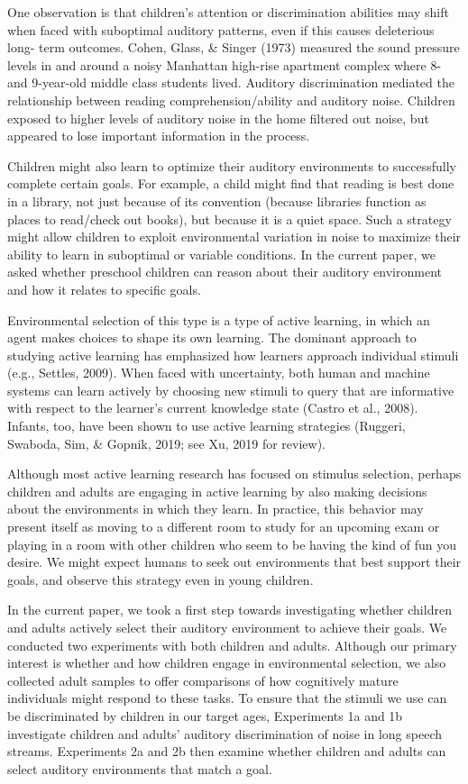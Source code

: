 \documentclass[10pt, letterpaper]{article}
\begin{document}
One observation is that children's attention or discrimination abilities
may shift when faced with suboptimal auditory patterns, even if this
causes deleterious long- term outcomes. Cohen, Glass, \& Singer (1973)
measured the sound pressure levels in and around a noisy Manhattan
high-rise apartment complex where 8- and 9-year-old middle class
students lived. Auditory discrimination mediated the relationship
between reading comprehension/ability and auditory noise. Children
exposed to higher levels of auditory noise in the home filtered out
noise, but appeared to lose important information in the process.

Children might also learn to optimize their auditory environments to
successfully complete certain goals. For example, a child might find
that reading is best done in a library, not just because of its
convention (because libraries function as places to read/check out
books), but because it is a quiet space. Such a strategy might allow
children to exploit environmental variation in noise to maximize their
ability to learn in suboptimal or variable conditions. In the current
paper, we asked whether preschool children can reason about their
auditory environment and how it relates to specific goals.

Environmental selection of this type is a type of active learning, in
which an agent makes choices to shape its own learning. The dominant
approach to studying active learning has emphasized how learners
approach individual stimuli (e.g., Settles, 2009). When faced with
uncertainty, both human and machine systems can learn actively by
choosing new stimuli to query that are informative with respect to the
learner's current knowledge state (Castro et al., 2008). Infants, too,
have been shown to use active learning strategies (Ruggeri, Swaboda,
Sim, \& Gopnik, 2019; see Xu, 2019 for review).

Although most active learning research has focused on stimulus
selection, perhaps children and adults are engaging in active learning
by also making decisions about the environments in which they learn. In
practice, this behavior may present itself as moving to a different room
to study for an upcoming exam or playing in a room with other children
who seem to be having the kind of fun you desire. We might expect humans
to seek out environments that best support their goals, and observe this
strategy even in young children.

In the current paper, we took a first step towards investigating whether
children and adults actively select their auditory environment to
achieve their goals. We conducted two experiments with both children and
adults. Although our primary interest is whether and how children engage
in environmental selection, we also collected adult samples to offer
comparisons of how cognitively mature individuals might respond to these
tasks. To ensure that the stimuli we use can be discriminated by
children in our target ages, Experiments 1a and 1b investigate children
and adults' auditory discrimination of noise in long speech streams.
Experiments 2a and 2b then examine whether children and adults can
select auditory environments that match a goal.
\end{document}
